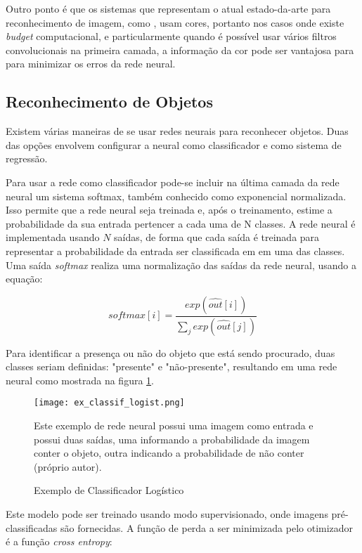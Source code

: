 Outro ponto é que os sistemas que representam o atual
estado-da-arte para reconhecimento de imagem, como \cite{szegedy2015going}
\cite{hasanpour2016lets}, usam cores, portanto nos casos onde
existe \emph{budget} computacional, e particularmente quando é possível usar
vários filtros convolucionais na primeira camada, a informação da cor pode
ser vantajosa para para minimizar os erros da rede neural.

\subsection{Reconhecimento de Objetos}
Existem várias maneiras de se usar redes neurais para reconhecer objetos. Duas
das opções envolvem configurar a neural como classificador e como sistema de
regressão.

Para usar a rede como classificador pode-se incluir na última camada da rede
neural um sistema softmax, também conhecido como exponencial normalizada. Isso
permite que a rede neural seja treinada e, após o treinamento, estime a
probabilidade da sua entrada pertencer a cada uma de N classes. A rede neural é
implementada usando $N$ saídas, de forma que cada saída é treinada para
representar a probabilidade da entrada ser classificada em em uma das classes.
Uma saída \emph{softmax} realiza uma normalização das saídas da rede neural,
usando a equação:

\begin{equation}
	softmax[i] = \frac
		{exp\left( \widehat{out}[i] \right)}
		{\sum_j exp\left( \widehat{out}[j] \right)}
\end{equation}

Para identificar a presença ou não do objeto que está sendo procurado, duas
classes seriam definidas: "presente" e "não-presente", resultando em uma rede
neural como mostrada na figura \ref{fig:ex_classif_logist}.

\begin{figure}[!htb]
	\centering
	\texttt{[image: ex\_classif\_logist.png]}
	\caption{Exemplo de Classificador Logístico}
	\label{fig:ex_classif_logist}
	Este exemplo de rede neural possui uma imagem como entrada e possui duas
	saídas, uma informando a probabilidade da imagem conter o objeto, outra
	indicando a probabilidade de não conter (próprio autor).
\end{figure}

Este modelo pode ser treinado usando modo supervisionado, onde imagens
pré-classificadas são fornecidas. A função de perda a ser minimizada pelo
otimizador é a função \emph{cross entropy}:

